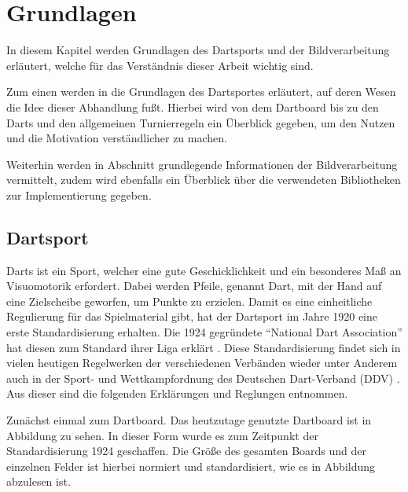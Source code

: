 
\chapter{Grundlagen}
\label{chap:fundamentals}
In diesem Kapitel werden Grundlagen des Dartsports und der Bildverarbeitung erläutert, welche für das Verständnis dieser Arbeit wichtig sind. 

Zum einen werden in  die Grundlagen des Dartsportes erläutert, auf deren Wesen die Idee dieser Abhandlung fußt. Hierbei wird von dem Dartboard bis zu den Darts und den allgemeinen Turnierregeln ein Überblick gegeben, um den Nutzen und die Motivation verständlicher zu machen.

Weiterhin werden in Abschnitt  grundlegende Informationen der Bildverarbeitung vermittelt, zudem wird ebenfalls ein Überblick über die verwendeten Bibliotheken zur Implementierung gegeben.

\section{Dartsport}
\label{sec:darts}
Darts ist ein Sport, welcher eine gute Geschicklichkeit und ein besonderes Maß an Visuomotorik erfordert. Dabei werden Pfeile, genannt Dart, mit der Hand auf eine Zielscheibe geworfen, um Punkte zu erzielen. Damit es eine einheitliche Regulierung für das Spielmaterial gibt, hat der Dartsport im Jahre 1920 eine erste Standardisierung erhalten. Die 1924 gegründete "`National Dart Association"' hat diesen zum Standard ihrer Liga erklärt \autocite[5]{guide2013}. Diese Standardisierung findet sich in vielen heutigen Regelwerken der verschiedenen Verbänden wieder unter Anderem auch in der Sport- und Wettkampfordnung des Deutschen
Dart-Verband (DDV) \autocite{DartsRegel2016}. Aus dieser sind die folgenden Erklärungen und Reglungen entnommen. 

Zunächst einmal zum Dartboard. Das heutzutage genutzte Dartboard ist in Abbildung zu sehen. In dieser Form wurde es zum Zeitpunkt der Standardisierung 1924 geschaffen. Die Größe des gesamten Boards und der einzelnen Felder ist hierbei normiert und standardisiert, wie es in Abbildung  abzulesen ist. 

